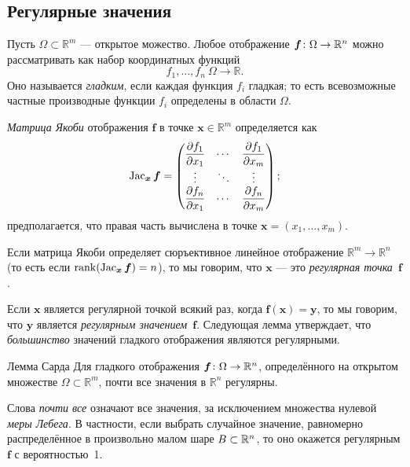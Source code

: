 \begin{multicols}{2}
{\subsection*{Регулярные значения}

Пусть $\Omega\subset\mathbb{R}^m$ --- открытое можество.
Любое отображение $\bm{f}\:\Omega\z\to\mathbb{R}^n$ можно рассматривать как набор координатных функций
\[f_1,\dots,f_n\:\Omega\to \mathbb{R}.\]
Оно называется \emph{гладким}, если каждая функция $f_i$ гладкая;
то есть всевозможные частные производные функции $f_i$ определены в области $\Omega$.

\emph{Матрица Якоби} отображения $\bm{f}$ в точке $\bm{x}\in\mathbb{R}^m$ определяется как 
\[\mathop{\rm Jac}\nolimits_{\bm{x}}\bm{f}=
\begin{pmatrix}
\dfrac{\partial f_1}{\partial x_1} & \cdots & \dfrac{\partial f_1}{\partial x_m}\\
\vdots & \ddots & \vdots\\
\dfrac{\partial f_n}{\partial x_1} & \cdots & \dfrac{\partial f_n}{\partial x_m} \end{pmatrix};\]
предполагается, что правая часть вычислена в точке $\bm{x}=(x_1,\dots,x_m)$.

Если матрица Якоби определяет сюръективное линейное отображение $\mathbb{R}^m\to\mathbb{R}^n$ (то есть если $\rank(\Jac_{\bm{x}}\bm{f})\z=n$), то мы говорим, что
$\bm{x}$ --- это \emph{регулярная точка}~$\bm{f}$.

Если $\bm{x}$ является регулярной точкой всякий раз, когда $\bm{f}(\bm{x})=\bm{y}$,
то мы говорим, что $\bm{y}$ является \emph{регулярным значением}~$\bm{f}$.
Следующая лемма утверждает, что \textit{большинство} значений гладкого отображения являются регулярными.

\begin{thm}{Лемма Сарда}\label{lem:sard}
Для гладкого отображения $\bm{f}\colon \Omega \z\to \mathbb{R}^n$, определённого на открытом множестве $\Omega\subset \mathbb{R}^m$, почти все значения в $\mathbb{R}^n$ регулярны.
\end{thm}

Слова \emph{почти все} означают все значения, за исключением множества нулевой {}\emph{меры Лебега}.
В частности, если выбрать случайное значение, равномерно распределённое в произвольно малом шаре $B\z\subset \mathbb{R}^n$, то оно окажется регулярным $\bm{f}$ с вероятностью~1.

}
\end{multicols}
